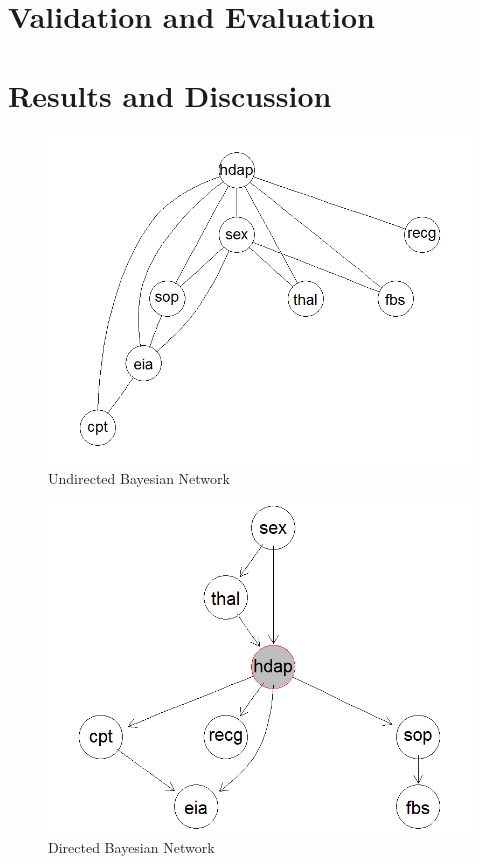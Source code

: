 \documentclass[conference]{IEEEtran}
\begin{document}
\section{Validation and Evaluation}

\section{Results and Discussion}
\begin{figure}[!ht]
\centering
\includegraphics[width=\columnwidth]{bn_statloghealth_undirected}
\caption{Undirected Bayesian Network}
\label{fig_statloghealth_undirected}
\end{figure}

\begin{figure}[!ht]
\centering
\includegraphics[width=\columnwidth]{bn_statloghealth}
\caption{Directed Bayesian Network}
\label{fig_statloghealth}
\end{figure}
\end{document}
